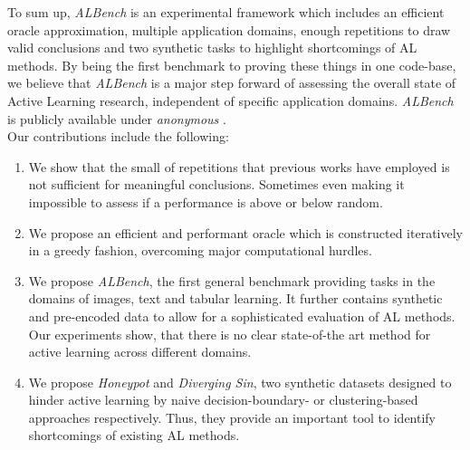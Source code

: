 \documentclass[]{article}
\begin{document}
To sum up, \emph{ALBench} is an experimental framework which includes an
efficient oracle approximation, multiple application domains, enough repetitions to
draw valid conclusions and two synthetic tasks to highlight shortcomings of AL methods. 
By being the first benchmark to proving these things in one code-base, 
we believe that \emph{ALBench} is a major step forward of assessing the overall state of Active Learning research, independent of
specific application domains. \emph{ALBench} is publicly available under \emph{anonymous} . \\ [1mm]
Our contributions include the following:
%
\begin{enumerate}
\item\label{cont:repetitions} We show that the small of repetitions that previous works have employed is not
sufficient for meaningful conclusions. Sometimes even making it impossible to assess if a performance is above or below random.
\item\label{cont:oracle} We propose an efficient and performant oracle which is constructed iteratively in a greedy fashion,
overcoming major computational hurdles.
\item\label{cont:domains} We propose \emph{ALBench}, the first general benchmark providing tasks
in the domains of images, text and tabular learning. It further contains
synthetic and pre-encoded data to allow for a sophisticated evaluation of AL
methods. Our experiments show, that there is no clear state-of-the art method
for active learning across different domains.
\item\label{cont:synthdata} We propose \emph{Honeypot} and \emph{Diverging Sin}, two synthetic datasets
designed to hinder active learning by naive decision-boundary- or
clustering-based approaches respectively. Thus, they provide an important tool to identify 
shortcomings of existing AL methods.
\end{enumerate}
%
\end{document}
